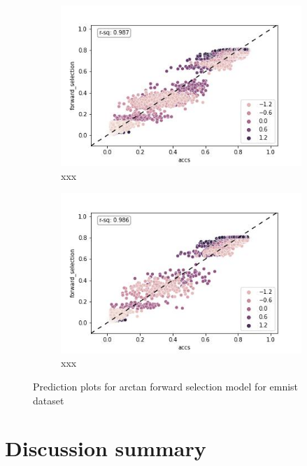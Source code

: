 \documentclass{article} %
\begin{document}
\begin{figure}
    \begin{subfigure}{.5\textwidth}
        \centering
        \includegraphics[width=.8\linewidth]{emnist/arctan_all_epochs_forward_selection.jpg}
        \caption{xxx}
        \label{fig:emnist_prediction_plot_train}
    \end{subfigure}%
    \begin{subfigure}{.5\textwidth}
        \centering
        \includegraphics[width=.8\linewidth]{emnist/arctan_all_epochs_forward_selection_val.jpg}
        \caption{xxx}
        \label{fig:emnist_prediction_plot_val}
    \end{subfigure}
    \caption{Prediction plots for arctan forward selection model for emnist dataset}
    \label{fig:emnist_prediction_plot}
\end{figure}
\section{Discussion summary}
\end{document}
